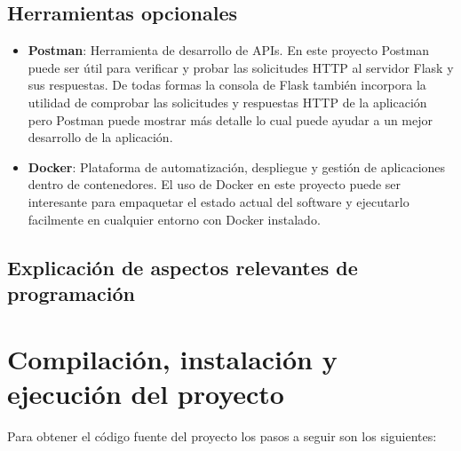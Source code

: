 \subsection{Herramientas opcionales}

\begin{itemize}
\tightlist

\item \textbf{Postman}: Herramienta de desarrollo de APIs. En este proyecto Postman puede ser útil para verificar y probar las solicitudes HTTP al servidor Flask y sus respuestas. De todas formas la consola de Flask también incorpora la utilidad de comprobar las solicitudes y respuestas HTTP de la aplicación pero Postman puede mostrar más detalle lo cual puede ayudar a un mejor desarrollo de la aplicación.


\item \textbf{Docker}: Plataforma de automatización, despliegue y gestión de aplicaciones dentro de contenedores. El uso de Docker en este proyecto puede ser interesante para empaquetar el estado actual del software y ejecutarlo facilmente en cualquier entorno con Docker instalado.


\end{itemize}

\subsection{Explicación de aspectos relevantes de programación}

\section{Compilación, instalación y ejecución del proyecto}

Para obtener el código fuente del proyecto los pasos a seguir son los siguientes:

